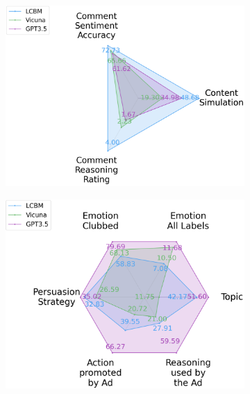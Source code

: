 \begin{figure}[!t]
{{\begin{subfigure}[b]{0.25\textwidth}
    \includegraphics[width=1\textwidth]{images/content_simulation_scores.pdf}
    \caption{}
\end{subfigure}
\begin{subfigure}[b]{0.24\textwidth}
    \includegraphics[width=1\textwidth]{images/content_understanding_scores.pdf}
    \caption{}
\end{subfigure}
\begin{subfigure}[b]{0.25\textwidth}

\end{subfigure}}}
\end{figure}
